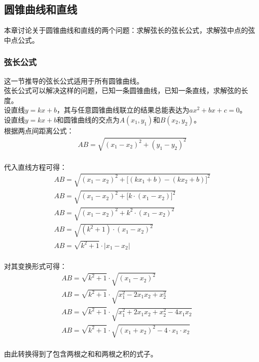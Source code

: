 \documentclass[UTF8]{ctexart}
\begin{document}
\newpage

\subsection{圆锥曲线和直线}
    本章讨论关于圆锥曲线和直线的两个问题：求解弦长的弦长公式，求解弦中点的弦中点公式。

\subsubsection{弦长公式}
    \setcounter{equation}{0}
    这一节推导的弦长公式适用于所有圆锥曲线。\\[3mm]
    弦长公式可以解决这样的问题，已知一条圆锥曲线，已知一条直线，求解弦的长度。\\[3mm]
    设直线$y=kx+b$，其与任意圆锥曲线联立的结果总能表达为$ax^2+bx+c=0$。\\[3mm]
    设直线$y=kx+b$和圆锥曲线的交点为$A(x_1,y_1)$和$B(x_2,y_2)$。\\[6mm]
    根据两点间距离公式：
    \begin{align}
        &AB=\sqrt{(x_1-x_2)^2+(y_1-y_2)^2}
    \end{align}\\
    代入直线方程可得：
    \begin{align}
        &AB=\sqrt{(x_1-x_2)^2+\big[(kx_1+b)-(kx_2+b)\big]^2}\\[3.5mm]
        &AB=\sqrt{(x_1-x_2)^2+\big[k\cdot(x_1-x_2)\big]^2}\\[3.5mm]
        &AB=\sqrt{(x_1-x_2)^2+k^2\cdot(x_1-x_2)^2}\\[3.5mm]
        &AB=\sqrt{(k^2+1)\cdot(x_1-x_2)^2}\\[3.5mm]
        &AB=\sqrt{k^2+1}\cdot|x_1-x_2|
    \end{align}\\
    对其变换形式可得：
    \begin{align}
        &AB=\sqrt{k^2+1}\cdot\sqrt{(x_1-x_2)^2}\\[3.5mm]
        &AB=\sqrt{k^2+1}\cdot\sqrt{x_1^2-2x_1x_2+x_2^2}\\[3.5mm]
        &AB=\sqrt{k^2+1}\cdot\sqrt{x_1^2+2x_1x_2+x_2^2-4x_1x_2}~~~~~~~\\[3.5mm]
        &AB=\sqrt{k^2+1}\cdot\sqrt{(x_1+x_2)^2-4\cdot x_1\cdot x_2}
    \end{align}\\
    由此转换得到了包含两根之和和两根之积的式子。

\newpage
\end{document}
